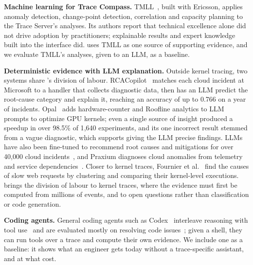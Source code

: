 \textbf{Machine learning for Trace Compass.} TMLL~\cite{shahedi2025tmll}, built with Ericsson, applies anomaly detection, change-point detection, correlation and capacity planning to the Trace Server's analyses. Its authors report that technical excellence alone did not drive adoption by practitioners; explainable results and expert knowledge built into the interface did. \sysname uses TMLL as one source of supporting evidence, and we evaluate TMLL's analyses, given to an LLM, as a baseline.

\textbf{Deterministic evidence with LLM explanation.} Outside kernel tracing, two systems share \sysname's division of labour. RCACopilot~\cite{chen2024rcacopilot} matches each cloud incident at Microsoft to a handler that collects diagnostic data, then has an LLM predict the root-cause category and explain it, reaching an accuracy of up to 0.766 on a year of incidents. Opal~\cite{zaeed2025opal} adds hardware-counter and Roofline analytics to LLM prompts to optimize GPU kernels; even a single source of insight produced a speedup in over 98.5\% of 1{,}640 experiments, and its one incorrect result stemmed from a vague diagnostic, which supports giving the LLM precise findings. LLMs have also been fine-tuned to recommend root causes and mitigations for over 40{,}000 cloud incidents~\cite{ahmed2023recommending}, and Praxium diagnoses cloud anomalies from telemetry and service dependencies~\cite{kumar2026praxium}. Closer to kernel traces, Fournier et al.~\cite{fournier2021cause} find the causes of slow web requests by clustering and comparing their kernel-level executions. \sysname brings the division of labour to kernel traces, where the evidence must first be computed from millions of events, and to open questions rather than classification or code generation.

\textbf{Coding agents.} General coding agents such as Codex~\cite{codexcli} interleave reasoning with tool use~\cite{yao2023react} and are evaluated mostly on resolving code issues~\cite{jimenez2024swebench}; given a shell, they can run tools over a trace and compute their own evidence. We include one as a baseline: it shows what an engineer gets today without a trace-specific assistant, and at what cost.
